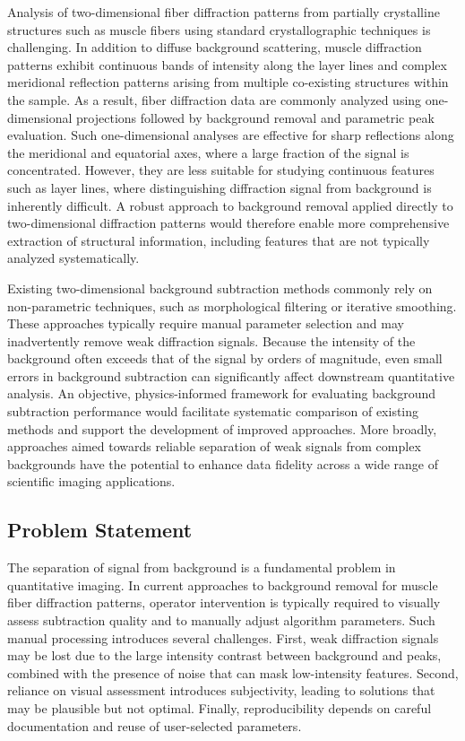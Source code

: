 \documentclass[iucr]{iucrjournals}
\begin{document}
Analysis of two-dimensional fiber diffraction patterns from partially crystalline structures such as muscle fibers using standard crystallographic techniques is challenging. In addition to diffuse background scattering, muscle diffraction patterns exhibit continuous bands of intensity along the layer lines and complex meridional reflection patterns arising from multiple co-existing structures within the sample. As a result, fiber diffraction data are commonly analyzed using one-dimensional projections followed by background removal and parametric peak evaluation. Such one-dimensional analyses are effective for sharp reflections along the meridional and equatorial axes, where a large fraction of the signal is concentrated. However, they are less suitable for studying continuous features such as layer lines, where distinguishing diffraction signal from background is inherently difficult. A robust approach to background removal applied directly to two-dimensional diffraction patterns would therefore enable more comprehensive extraction of structural information, including features that are not typically analyzed systematically.

Existing two-dimensional background subtraction methods commonly rely on non-parametric techniques, such as morphological filtering or iterative smoothing. These approaches typically require manual parameter selection and may inadvertently remove weak diffraction signals. Because the intensity of the background often exceeds that of the signal by orders of magnitude, even small errors in background subtraction can significantly affect downstream quantitative analysis. An objective, physics-informed framework for evaluating background subtraction performance would facilitate systematic comparison of existing methods and support the development of improved approaches. More broadly, approaches aimed towards reliable separation of weak signals from complex backgrounds have the potential to enhance data fidelity across a wide range of scientific imaging applications.

\subsection{Problem Statement}

The separation of signal from background is a fundamental problem in quantitative imaging. In current approaches to background removal for muscle fiber diffraction patterns, operator intervention is typically required to visually assess subtraction quality and to manually adjust algorithm parameters. Such manual processing introduces several challenges. First, weak diffraction signals may be lost due to the large intensity contrast between background and peaks, combined with the presence of noise that can mask low-intensity features. Second, reliance on visual assessment introduces subjectivity, leading to solutions that may be plausible but not optimal. Finally, reproducibility depends on careful documentation and reuse of user-selected parameters.
\end{document}
